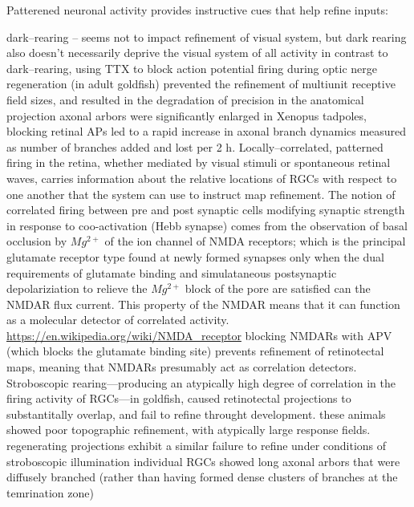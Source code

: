 \documentclass[11pt, a4paper, oneside]{article}   	%
\begin{document}
\begin{outline}
 \point Patterened neuronal activity provides instructive cues that help refine inputs:

  \subpoint dark--rearing -- seems not to impact refinement of visual system, but dark rearing also doesn't necessarily deprive the visual system of all activity
    \subpoint in contrast to dark--rearing, using TTX to block action potential firing during optic nerge regeneration (in adult goldfish) prevented the refinement of multiunit receptive field sizes, and resulted in the degradation of precision in the anatomical projection
      \subsubpoint axonal arbors were significantly enlarged
        \supersubpoint in Xenopus tadpoles, blocking retinal APs led to a rapid increase in axonal branch dynamics measured as number of branches added and lost per 2 h.
    \subpoint Locally--correlated, patterned firing in the retina, whether mediated by visual stimuli or spontaneous retinal waves, carries information about the relative locations of RGCs with respect to one another that the system can use to instruct map refinement.
      \subsubpoint The notion of correlated firing between pre and post synaptic cells modifying synaptic strength in response to coo-activation (Hebb synapse) comes from the observation of basal occlusion by $Mg^{2+}$ of the ion channel of NMDA receptors; which is the principal glutamate receptor type found at newly formed synapses
        \supersubpoint only when the dual requirements of glutamate binding and simulataneous postsynaptic depolariziation to relieve the $Mg^{2+}$ block of the pore are satisfied can the NMDAR flux current. This property of the NMDAR means that it can function as a molecular detector of correlated activity.
        \supersubpoint \url{https://en.wikipedia.org/wiki/NMDA_receptor}
      \subsubpoint blocking NMDARs with APV (which blocks the glutamate binding site) prevents refinement of retinotectal maps, meaning that NMDARs presumably act as correlation detectors.
    \subpoint Stroboscopic rearing---producing an atypically high degree of correlation in the firing activity of RGCs---in goldfish, caused retinotectal projections to substantitally overlap, and fail to refine throught development.
        \subsubpoint these animals showed poor topographic refinement, with atypically large response fields.
            \supersubpoint regenerating projections exhibit a similar failure to refine under conditions of stroboscopic illumination
        \subsubpoint individual RGCs showed long axonal arbors that were diffusely branched (rather than having formed dense clusters of branches at the temrination zone)

\end{outline}
\end{document}
